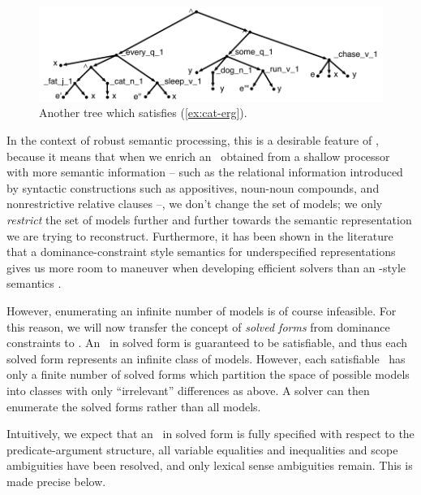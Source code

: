 \begin{figure}
  \centering
  \includegraphics[width=\columnwidth]{pic-more-stuff}
  \caption{Another tree which satisfies (\ref{ex:cat-erg}).}
  \label{fig:fat-black-cat}
\end{figure}

In the context of robust semantic processing, this is a desirable
feature of \rmrs, because it means that when we enrich an \rmrs\
obtained from a shallow processor with more semantic information --
such as the relational information introduced by syntactic
constructions such as appositives, noun-noun compounds, and
nonrestrictive relative clauses --, we don't change the set of models;
we only \emph{restrict} the set of models further and further towards
the semantic representation we are trying to reconstruct.
Furthermore, it has been shown in the literature that a
dominance-constraint style semantics for underspecified
representations gives us more room to maneuver when developing
efficient solvers than an \mrs-style semantics
\cite{Althaus_etal:JoA}.

However, enumerating an infinite number of models is of course
infeasible.  For this reason, we will now transfer the concept of
\emph{solved forms} from dominance constraints to \rmrs.  An \rmrs\ in
solved form is guaranteed to be satisfiable, and thus each solved form
represents an infinite class of models.  However, each satisfiable
\rmrs\ has only a finite number of solved forms which partition the
space of possible models into classes with only ``irrelevant''
differences as above.  A solver can then enumerate the solved forms
rather than all models.

Intuitively, we expect that an \rmrs\ in solved form is fully
specified with respect to the predicate-argument structure, all
variable equalities and inequalities and scope ambiguities have been
resolved, and only lexical sense ambiguities remain.  This is made
precise below.

